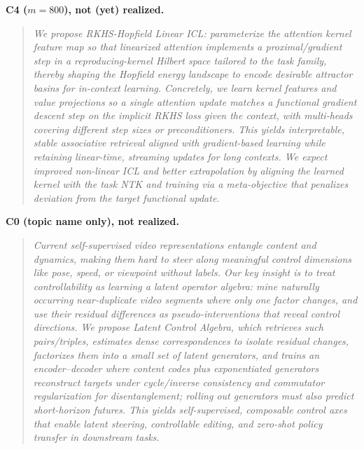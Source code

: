 \documentclass{article} %
\begin{document}
\textbf{C4 ($m{=}800$), not (yet) realized.}
\begin{quote}\small\itshape
We propose RKHS-Hopfield Linear ICL: parameterize the attention kernel feature map so that linearized attention implements a proximal/gradient step in a reproducing-kernel Hilbert space tailored to the task family, thereby shaping the Hopfield energy landscape to encode desirable attractor basins for in-context learning. Concretely, we learn kernel features and value projections so a single attention update matches a functional gradient descent step on the implicit RKHS loss given the context, with multi-heads covering different step sizes or preconditioners. This yields interpretable, stable associative retrieval aligned with gradient-based learning while retaining linear-time, streaming updates for long contexts. We expect improved non-linear ICL and better extrapolation by aligning the learned kernel with the task NTK and training via a meta-objective that penalizes deviation from the target functional update.
\end{quote}

\textbf{C0 (topic name only), not realized.}
\begin{quote}\small\itshape
Current self-supervised video representations entangle content and dynamics, making them hard to steer along meaningful control dimensions like pose, speed, or viewpoint without labels. Our key insight is to treat controllability as learning a latent operator algebra: mine naturally occurring near-duplicate video segments where only one factor changes, and use their residual differences as pseudo-interventions that reveal control directions. We propose Latent Control Algebra, which retrieves such pairs/triples, estimates dense correspondences to isolate residual changes, factorizes them into a small set of latent generators, and trains an encoder--decoder where content codes plus exponentiated generators reconstruct targets under cycle/inverse consistency and commutator regularization for disentanglement; rolling out generators must also predict short-horizon futures. This yields self-supervised, composable control axes that enable latent steering, controllable editing, and zero-shot policy transfer in downstream tasks.
\end{quote}
\end{document}
